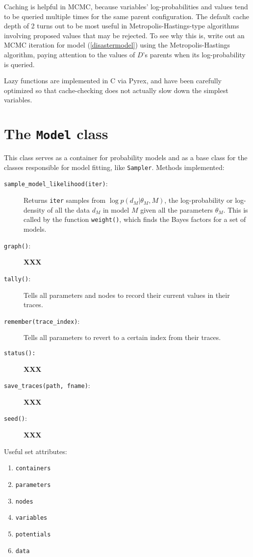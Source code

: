 Caching is helpful in MCMC, because variables' log-probabilities and values tend to be queried multiple times for the same parent configuration. The default cache depth of 2 turns out to be most useful in Metropolis-Hastings-type algorithms involving proposed values that may be rejected. To see why this is, write out an MCMC iteration for model (\ref{disastermodel}) using the Metropolis-Hastings algorithm, paying attention to the values of $D$'s parents when its log-probability is queried.

Lazy functions are implemented in C via Pyrex, and have been carefully optimized so that cache-checking does not actually slow down the simplest variables.


\section{The \texttt{Model} class} \label{sec:Model}
This class serves as a container for probability models and as a base class for the classes responsible for model fitting, like \texttt{Sampler}. Methods implemented:
\begin{description}
    \item[\texttt{sample\_model\_likelihood(\texttt{iter})}:] Returns \texttt{iter} samples from $\log p(d_M|\theta_M, M)$, the log-probability or log-density of all the data $d_M$ in model $M$ given all the parameters $\theta_M$. This is called by the function \texttt{weight()}, which finds the Bayes factors for a set of models.
    \item[\texttt{graph()}:] \textbf{XXX}
    \item[\texttt{tally()}:] Tells all parameters and nodes to record their current values in their traces.
    \item[\texttt{remember(trace\_index)}:] Tells all parameters to revert to a certain index from their traces.
    \item[\texttt{status():}] \textbf{XXX}
    \item[\texttt{save\_traces(path, fname)}:] \textbf{XXX}
    \item[\texttt{seed()}:] \textbf{XXX}
\end{description}

Useful set attributes:
\begin{enumerate}
    \item \texttt{containers}
    \item \texttt{parameters}
    \item \texttt{nodes}
    \item \texttt{variables}
    \item \texttt{potentials}
    \item \texttt{data}
\end{enumerate}



